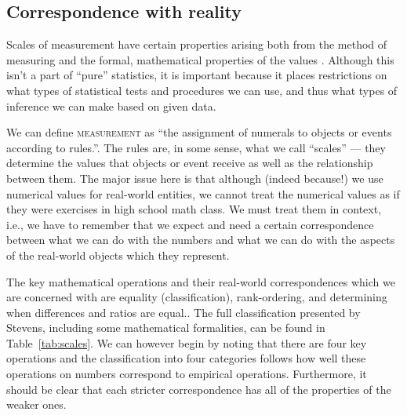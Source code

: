 \documentclass[a4paper,12pt,oneside,leqno]{scrartcl}%
\newcommand{\terminus}[1]{\textsc{#1}}
\begin{document}
\subsection{Correspondence with reality}
Scales of measurement have certain properties arising both from the method of measuring and the formal, mathematical properties of the values . 
Although this isn't a part of ``pure'' statistics, it is important because it places restrictions on what types of statistical tests and procedures we can use, and thus what types of inference we can make based on given data.

We can define \terminus{measurement} as ``the assignment of numerals to objects or events according to rules.''\citep[p. 677]{stevens1946a}.  
The rules are, in some sense, what we call ``scales'' --- they determine the values that objects or event receive as well as the relationship between them.  
The major issue here is that although (indeed because!) we use numerical values for real-world entities, we cannot treat the numerical values as if they were exercises in high school math class.  
We must treat them in context, i.e., we have to remember that we expect and need a certain correspondence between what we can do with the numbers and what we can do with the aspects of the real-world objects which they represent.

The key mathematical operations and their real-world correspondences which we are concerned with are equality (classification), rank-ordering, and determining when differences and ratios are equal.\citep[p. 677]{stevens1946a}.  
The full classification presented by Stevens, including some mathematical formalities, can be found in Table~\ref{tab:scales}.  
We can however begin by noting that there are four key operations and the classification into four categories follows how well these operations on numbers correspond to empirical operations. Furthermore, it should be clear that each stricter correspondence has all of the properties of the weaker ones.
\end{document}
